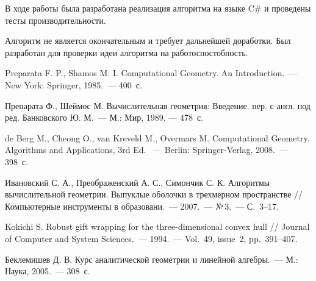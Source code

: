 \documentclass[14pt]{extarticle}
\begin{document}
В ходе работы была разработана реализация алгоритма на языке C\# и проведены тесты производительности.


Алгоритм не является окончательным и требует дальнейшей доработки.
Был разработан для проверки идеи алгоритма на работоспостобность.


\newpage

\newpage
{}
\begin{thebibliography}{9}
 Preparata F. P., Shamos M. I. Computational Geometry. An Introduction.~--- New York: Springer, 1985.~--- 400~с.

 Препарата Ф., Шеймос М. Вычислительная геометрия: Введение. пер. с англ. под ред. Банковского Ю. М.~--- М.: Мир, 1989. --- 478~с.

 de Berg M., Cheong O., van Kreveld M., Overmars M. Computational Geometry. Algorithms and Applications, 3rd Ed. ~--- Berlin: Springer-Verlag, 2008.~--- 398~с.

 Ивановский С. А., Преображенский А. С., Симончик С. К. Алгоритмы вычислительной геометрии. Выпуклые оболочки в трехмерном пространстве // Компьютерные инструменты в образовани.~--- 2007.~--- №\,3.~--- С.~3--17.

 Kokichi S. Robust gift wrapping for the three-dimensional convex hull // Journal of Computer and System Sciences.~--- 1994.~--- Vol.~49, issue~2, pp.~391--407.

 Беклемишев Д. В. Курс аналитической геометрии и линейной алгебры.~--- М.: Наука, 2005.~--- 308~с.
\end{thebibliography}


\label{lastpage}
\end{document}
